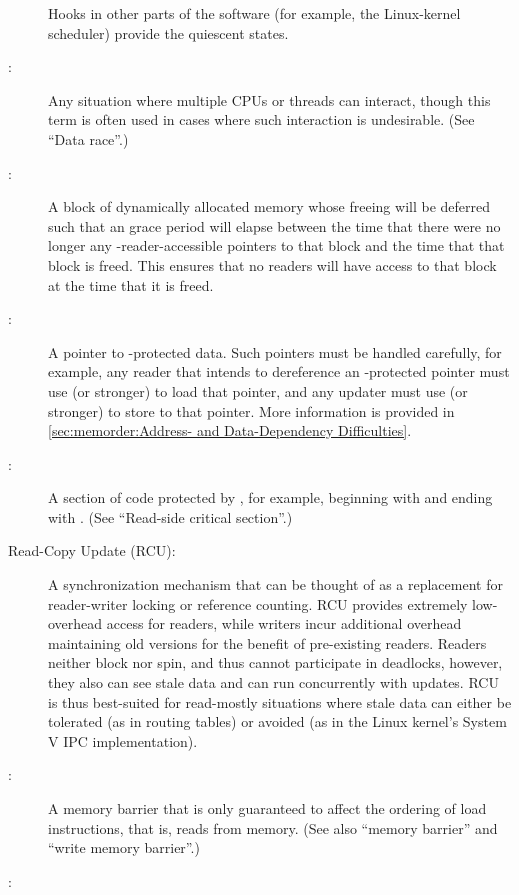 \begin{description}
	Hooks in other parts of the software (for example, the Linux-kernel
	scheduler) provide the quiescent states.
\item[\IXG{Race Condition}:]
	Any situation where multiple CPUs or threads can interact,
	though this term is often used in cases where such interaction
	is undesirable.
	(See ``Data race''.)
\item[\IXGaltr{RCU-Protected Data}{RCU-protected data}:]
	A block of dynamically allocated memory whose freeing will be
	deferred such that an  grace period will elapse between the
	time that there were no longer any -reader-accessible pointers
	to that block and the time that that block is freed.
	This ensures that no  readers will have access to that block at
	the time that it is freed.
\item[\IXGaltr{RCU-Protected Pointer}{RCU-protected pointer}:]
	A pointer to -protected data.
	Such pointers must be handled carefully, for example, any reader
	that intends to dereference an -protected pointer must
	use  (or stronger) to load that pointer,
	and any updater must use  (or stronger)
	to store to that pointer.
	More information is provided in
	\cref{sec:memorder:Address- and Data-Dependency Difficulties}.
\item[\IXGalthmr{RCU Read-Side Critical Section}{RCU read-side}{critical section}:]
	A section of code protected by , for example, beginning with
	 and ending with .
	(See ``Read-side critical section''.)
\item[Read-Copy Update (RCU):]
	A synchronization mechanism that can be thought of as a replacement
	for reader-writer locking or reference counting.
	RCU provides extremely low-overhead access for readers, while
	writers incur additional overhead maintaining old versions
	for the benefit of pre-existing readers.
	Readers neither block nor spin, and thus cannot participate in
	deadlocks, however, they also can see stale data and can
	run concurrently with updates.
	RCU is thus best-suited for read-mostly situations where
	stale data can either be tolerated (as in routing tables)
	or avoided (as in the Linux kernel's System V IPC implementation).
\item[\IXGh{Read}{Memory Barrier}:]
	A memory barrier that is only guaranteed to affect the ordering
	of load instructions, that is, reads from memory.
	(See also ``memory barrier'' and ``write memory barrier''.)
\item[\IXGalth{Read Miss}{read}{cache miss}:]

\end{description}
